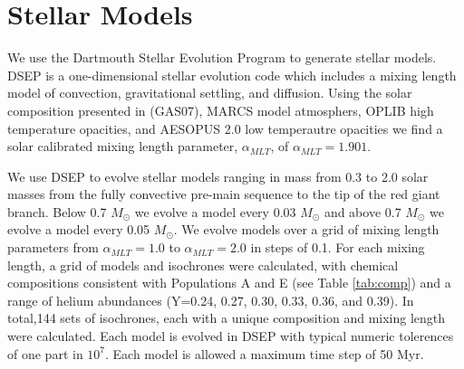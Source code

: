 \section{Stellar Models}\label{sec:modeling}
We use the Dartmouth Stellar Evolution Program \citep[DSEP, ][]{Dotter2008} to
generate stellar models. DSEP is a one-dimensional stellar
evolution code which includes a mixing length model of convection,
gravitational settling, and diffusion. Using the solar composition presented in
\citep{Grevesse2007} (GAS07), MARCS model atmosphers, OPLIB high temperature
opacities, and AESOPUS 2.0 low temperautre opacities we find a solar calibrated
mixing length parameter, $\alpha_{MLT}$, of $\alpha_{MLT} = 1.901$.

We use DSEP to evolve stellar models ranging in mass from 0.3 to 2.0 solar
masses from the fully convective pre-main sequence to the tip of the red giant
branch. Below 0.7 $M_{\odot}$ we evolve a model every 0.03 $M_{\odot}$ and
above 0.7 $M_{\odot}$ we evolve a model every 0.05 $M_{\odot}$. We evolve
models over a grid of mixing length parameters from $\alpha_{MLT} = 1.0$ to
$\alpha_{MLT} = 2.0$ in steps of 0.1. For each mixing length, a grid of models
and isochrones were calculated, with chemical compositions consistent with
Populations A and E (see Table \ref{tab:comp}) and a range of helium abundances
(Y=0.24, 0.27, 0.30, 0.33, 0.36, and 0.39). In total,144 sets of isochrones,
each with a unique composition and mixing length were calculated. Each model is
evolved in DSEP with typical numeric tolerences of one part in $10^{7}$. Each
model is allowed a maximum time step of 50 Myr. 

